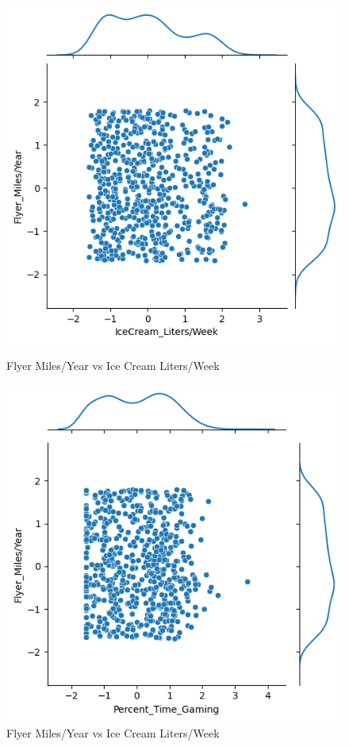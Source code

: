 \documentclass{article}
\begin{document}
\begin{figure}[H]
    \centering
    \begin{minipage}[b]{0.47\textwidth}
        \centering
        \includegraphics[width=\textwidth]{pre_c.png}
        \caption{Flyer Miles/Year vs Ice Cream Liters/Week}
    \end{minipage}
    \hfill
    \begin{minipage}[b]{0.47\textwidth}
        \centering
        \includegraphics[width=\textwidth]{pre_d.png}
        \caption{Flyer Miles/Year vs Ice Cream Liters/Week}
    \end{minipage}
\end{figure}
\end{document}
